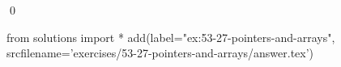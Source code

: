 
\begin{ex}
  \label{ex:53-27-pointers-and-arrays}
  
  \qed
\end{ex}
\begin{python0}
from solutions import *
add(label="ex:53-27-pointers-and-arrays",
    srcfilename='exercises/53-27-pointers-and-arrays/answer.tex')
\end{python0}
